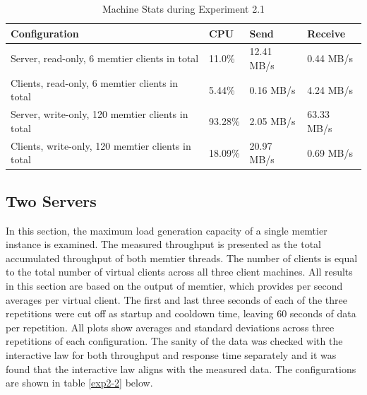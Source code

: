 \documentclass[11pt,a4paper]{article}
\begin{document}
\begin{center}
    \begin{table}
    	\begin{tabular}{|l|p{2cm}|p{2cm}|p{2cm}|}
            \hline \textbf{Configuration} & \textbf{CPU} & \textbf{Send} & \textbf{Receive}\\
            \hline Server, read-only, 6 memtier clients in total & 11.0\%         & 12.41 MB/s    & 0.44 MB/s\\
            \hline Clients, read-only, 6 memtier clients in total & 5.44\%           & 0.16 MB/s     & 4.24 MB/s\\
            \hline Server, write-only,  120 memtier clients in total & 93.28\%        & 2.05 MB/s     & 63.33 MB/s\\
            \hline Clients, write-only, 120 memtier clients in total & 18.09\%       & 20.97 MB/s     & 0.69 MB/s\\
            \hline
    	\end{tabular}
	\caption{Machine Stats during Experiment 2.1}
    \label{dstat:2-1}
	\end{table}
\end{center}

\subsection{Two Servers} \label{sec2.2}
In this section, the maximum load generation capacity of a single memtier instance is examined. The measured throughput is presented as the total accumulated throughput of both memtier threads. The number of clients is equal to the total number of virtual clients across all three client machines. All results in this section are based on the output of memtier, which provides per second averages per virtual client. The first and last three seconds of each of the three repetitions were cut off as startup and cooldown time, leaving 60 seconds of data per repetition. All plots show averages and standard deviations across three repetitions of each configuration. The sanity of the data was checked with the interactive law for both throughput and response time separately and it was found that the interactive law aligns with the measured data. The configurations are shown in table \autoref{exp2-2} below.
\end{document}

